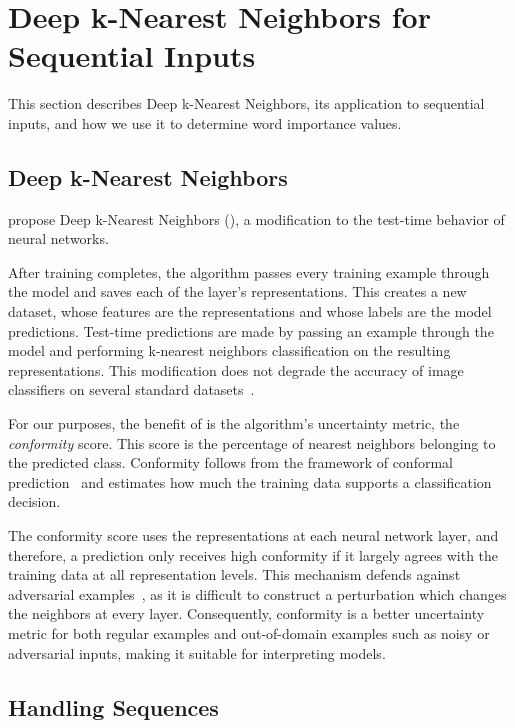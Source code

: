 \section{Deep k-Nearest Neighbors for Sequential Inputs}
\label{sec:deepknn}

This section describes Deep k-Nearest Neighbors,
its application to sequential inputs, and how we use it to 
determine word importance values.

\subsection{Deep k-Nearest Neighbors}

\citet{papernot2018dknn} propose Deep k-Nearest Neighbors
(\dknn{}), a modification to the test-time behavior
of neural networks.  

After training completes, the \dknn{} algorithm passes every training example
through the model and saves each of the layer's representations.
This creates a new dataset, whose features are the
representations and whose labels are the model predictions. Test-time predictions
are made by passing an example through the model and performing k-nearest neighbors classification
on the resulting representations. This modification does not degrade
the accuracy of image classifiers on several standard datasets~\cite{papernot2018dknn}.

For our purposes, the benefit of \dknn{} is the algorithm's uncertainty metric,
the \textit{conformity} score.  This score is the percentage of nearest
neighbors belonging to the predicted class. Conformity follows from the
framework of conformal prediction~\cite{shafer2008tutorial} and estimates how
much the training data supports a classification decision.  

The conformity score uses the representations at each neural network layer, and therefore, a prediction
only receives high conformity if it largely agrees with the training data at all representation
levels. This mechanism defends against adversarial examples~\cite{szegedy2013intriguing},
as it is difficult to construct a perturbation which changes the neighbors at every layer.
Consequently, conformity is a better uncertainty metric for both regular examples
and out-of-domain examples such as noisy or adversarial inputs,
making it suitable for interpreting models.

\subsection{Handling Sequences}

